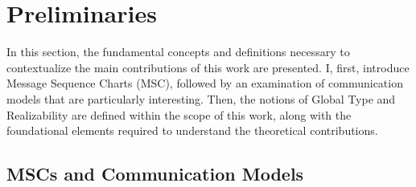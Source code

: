 \chapter{Preliminaries}\label{sec:pre}
In this section, the fundamental concepts and definitions necessary 
to contextualize the main contributions of this work are presented. 
I, first, introduce Message Sequence Charts (MSC), followed by 
an examination of communication models that are particularly interesting. 
Then, the notions of Global Type and Realizability are 
defined within the scope of this work, along with the foundational 
elements required to understand the theoretical contributions.

\section{MSCs and Communication Models}

